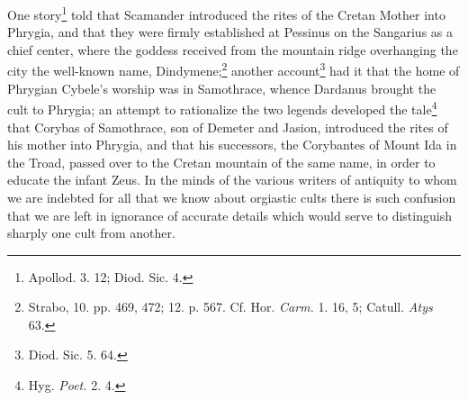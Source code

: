 \documentclass[a4paper, 12pt, oneside]{article}
\begin{document}
One story\footnote{Apollod. 3. 12; Diod. Sic. 4.} told that Scamander introduced the rites of the Cretan Mother into Phrygia, and that they were firmly established at Pessinus on the Sangarius as a chief center, where the goddess received from the mountain ridge overhanging the city the well-known name, Dindymene;\footnote{Strabo, 10. pp. 469, 472; 12. p. 567. Cf. Hor. \emph{Carm.} 1. 16, 5; Catull. \emph{Atys} 63.} another account\footnote{Diod. Sic. 5. 64.} had it that the home of Phrygian Cybele's worship was in Samothrace, whence Dardanus brought the cult to Phrygia; an attempt to rationalize the two legends developed the tale\footnote{Hyg. \emph{Poet.} 2. 4.} that Corybas of Samothrace, son of Demeter and Jasion, introduced the rites of his mother into Phrygia, and that his successors, the Corybantes of Mount Ida in the Troad, passed over to the Cretan mountain of the same name, in order to educate the infant Zeus. In the minds of the various writers of antiquity to whom we are indebted for all that we know about orgiastic cults there is such confusion that we are left in ignorance of accurate details which would serve to distinguish sharply one cult from another.
\end{document}
